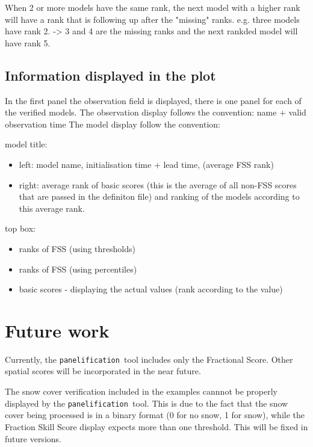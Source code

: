 \documentclass[11pt,a4paper]{article}
\newcommand{\panels}{\texttt{panelification }}
\begin{document}
When 2 or more models have the same rank, the next model with a higher rank will have a rank that is following up after the "missing" ranks.
e.g. three models have rank 2. -> 3 and 4 are the missing ranks and the next rankded model will have rank 5.

\subsection{Information displayed in the plot}

In the first panel the observation field is displayed, there is one panel for each of the verified models.
The observation display follows the convention:  name + valid observation time
The model display follow the convention:

model title:
\begin{itemize}
\item left: model name, initialisation time + lead time, (average FSS rank)
\item right: average rank of basic scores (this is the average of all non-FSS scores
    that are passed in the definiton file) and ranking of the models according to this average rank.
\end{itemize}

top box:
\begin{itemize}
\item ranks of FSS (using thresholds)
\item ranks of FSS (using percentiles)
\item basic scores - displaying the actual values (rank according to the value)
\end{itemize}


\section{Future work}
Currently, the \panels tool includes only the Fractional Score. Other spatial scores will be incorporated in the near future.

The snow cover verification included in the examples cannnot be properly displayed by the 
\panels tool. This is due to the fact that the snow cover being processed is in a binary format (0 for no snow, 1 for snow),
while the Fraction Skill Score display expects more than one threshold. This will be fixed in future versions.







\end{document}
